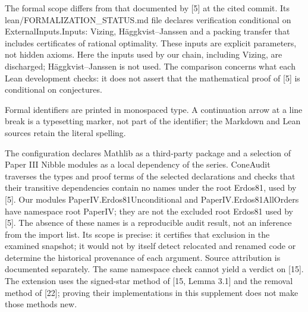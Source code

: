\documentclass[english,11pt,a4paper]{article}
\begin{document}
The formal scope differs from that documented by {[}5{]} at the cited commit. Its {\ttfamily\small lean/\discretionary{\hbox{\ensuremath{\hookrightarrow}}}{}{}FORMALIZATIO\discretionary{\hbox{\ensuremath{\hookrightarrow}}}{}{}N\_\discretionary{\hbox{\ensuremath{\hookrightarrow}}}{}{}STATUS.\discretionary{\hbox{\ensuremath{\hookrightarrow}}}{}{}md} file declares verification conditional on {\ttfamily\small ExternalInpu\discretionary{\hbox{\ensuremath{\hookrightarrow}}}{}{}ts.\discretionary{\hbox{\ensuremath{\hookrightarrow}}}{}{}Inputs}: Vizing, Häggkvist--Janssen and a packing transfer that includes certificates of rational optimality. These inputs are explicit parameters, not hidden axioms. Here the inputs used by our chain, including Vizing, are discharged; Häggkvist--Janssen is not used. The comparison concerns what each Lean development checks: it does not assert that the mathematical proof of {[}5{]} is conditional on conjectures.

Formal identifiers are printed in monospaced type. A continuation arrow at a line break is a typesetting marker, not part of the identifier; the Markdown and Lean sources retain the literal spelling.

The configuration declares Mathlib as a third-party package and a selection of Paper III {\ttfamily\small Nibble} modules as a local dependency of the series. {\ttfamily\small ConeAudit} traverses the types and proof terms of the selected declarations and checks that their transitive dependencies contain no names under the root {\ttfamily\small Erdos81}, used by {[}5{]}. Our modules {\ttfamily\small PaperIV.\discretionary{\hbox{\ensuremath{\hookrightarrow}}}{}{}Erdos81Uncon\discretionary{\hbox{\ensuremath{\hookrightarrow}}}{}{}ditional} and {\ttfamily\small PaperIV.\discretionary{\hbox{\ensuremath{\hookrightarrow}}}{}{}Erdos81AllOr\discretionary{\hbox{\ensuremath{\hookrightarrow}}}{}{}ders} have namespace root PaperIV; they are not the excluded root Erdos81 used by {[}5{]}. The absence of these names is a reproducible audit result, not an inference from the import list. Its scope is precise: it certifies that exclusion in the examined snapshot; it would not by itself detect relocated and renamed code or determine the historical provenance of each argument. Source attribution is documented separately. The same namespace check cannot yield a verdict on {[}15{]}. The extension uses the signed-star method of {[}15, Lemma 3.1{]} and the removal method of {[}22{]}; proving their implementations in this supplement does not make those methods new.
\end{document}
